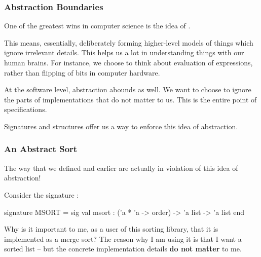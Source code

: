 \documentclass[aspectratio=169]{beamer}
\begin{document}
\begin{frame}[fragile]
  \frametitle{Abstraction Boundaries}

  One of the greatest wins in computer science is the idea of .

  \vspace{\fill}

  This means, essentially, deliberately forming higher-level models of things which
  ignore irrelevant details. This helps us a lot in understanding things with our
  human brains. For instance, we choose to think about evaluation of expressions,
  rather than flipping of bits in computer hardware.

  \vspace{\fill}

  At the software level, abstraction abounds as well. We want to choose to 
  ignore the parts of implementations that do not matter to us. This is the 
  entire point of specifications.
  
  \vspace{\fill}

  Signatures and structures offer us a way to enforce this idea of abstraction.
\end{frame}

\begin{frame}[fragile]
  \frametitle{An Abstract Sort}

  The way that we defined  and  earlier are actually
  in violation of this idea of abstraction!

  \vspace{\fill}

  Consider the signature :

  \begin{codeblock}
    signature MSORT =
      sig 
        val msort : ('a * 'a -> order) -> 'a list -> 'a list
      end
  \end{codeblock}

  \vspace{\fill}

  Why is it important to me, as a user of this sorting library, that it
  is implemented as a merge sort? The reason why I am using it is that I 
  want a sorted list -- but the concrete implementation details 
  \textbf{do not matter} to me.\footnotemark

\end{frame}
\end{document}

